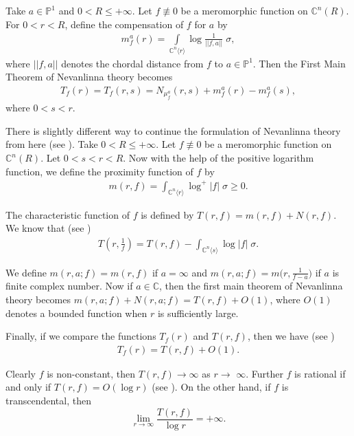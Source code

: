 \documentclass[11pt,reqno]{amsart}
\numberwithin{equation}{section}
\begin{document}
Take $a\in \mathbb{P}^1$ and $0<R\leq +\infty$. Let $f\not\equiv 0$ be a meromorphic function on $\mathbb{C}^n(R)$.
For $0<r<R$, define the compensation of $f$ for $a$ by
\begin{align*}
m^a_f(r)=\int\limits_{\mathbb{C}^n\langle r\rangle}\log \frac{1}{||f,a||} \;\sigma,
\end{align*}
where $||f,a||$ denotes the chordal distance from $f$ to $a\in\mathbb{P}^1$.
Then the First Main Theorem of Nevanlinna theory becomes
\begin{align*}
T_f(r)=T_f(r,s)=N_{\mu^a_f}(r,s)+m^a_f(r)-m^a_f(s),
\end{align*}
where $0<s<r$.	


There is slightly different way to continue the formulation of Nevanlinna theory from here (see \cite[pp.15]{Hu-Li-Yang-2003}).
Take $0<R\leq +\infty$. Let $f\not\equiv 0$ be a meromorphic function on $\mathbb{C}^n(R)$. Let $0<s<r<R$. 
Now with the help of the positive logarithm function, we define the proximity function of $f$ by
\begin{align*}
\displaystyle m(r, f)=\int_{\mathbb{C}^n\langle r\rangle} \log^+ |f|\;\sigma \geq  0.
\end{align*}

The characteristic function of $f$ is defined by $T(r,f)=m(r,f)+N(r,f)$. We know that (see \cite[pp.15]{Hu-Li-Yang-2003})
\begin{align*}
\displaystyle T\left(r,\frac{1}{f}\right)=T(r,f)-\int_{\mathbb{C}^n\langle s\rangle} \log |f|\;\sigma.
\end{align*}

We define $m(r,a;f)=m(r,f)$ if $a=\infty$ and $m(r,a;f)=m\big(r,\frac{1}{f-a}\big)$ if $a$ is finite complex number. Now if $a\in\mathbb{C}$, then the first main theorem of Nevanlinna theory becomes $m(r,a;f)+N(r,a;f)=T(r,f) + O(1)$, where $O(1)$ denotes a bounded function when $r$ is sufficiently large.

Finally, if we compare the functions $T_f(r)$ and $T(r,f)$, then we have (see \cite[pp.19]{Hu-Li-Yang-2003})
\begin{align*}
T_f(r)=T(r,f)+O(1).
\end{align*}

Clearly $f$ is non-constant, then $T(r, f) \rightarrow \infty$ as $r \rightarrow$ $\infty$. Further $f$ is rational if and only if $T(r,f)=O(\log r)$ (see \cite[pp. 19]{Stoll-1974}).
On the other hand, if $f$ is transcendental, then 
\[\lim\limits_{r \rightarrow \infty} \frac{T(r, f)}{\log r}=+\infty.\] 
\end{document}
